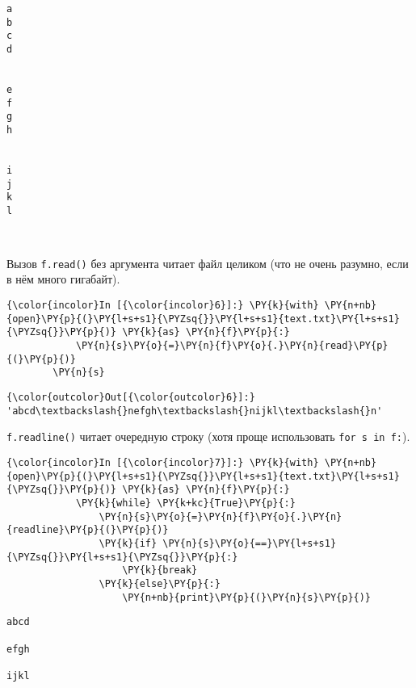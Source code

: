     \begin{Verbatim}[commandchars=\\\{\}]
a
b
c
d


e
f
g
h


i
j
k
l



    \end{Verbatim}

    Вызов \texttt{f.read()} без аргумента читает файл целиком (что не очень
разумно, если в нём много гигабайт).

    \begin{Verbatim}[commandchars=\\\{\}]
{\color{incolor}In [{\color{incolor}6}]:} \PY{k}{with} \PY{n+nb}{open}\PY{p}{(}\PY{l+s+s1}{\PYZsq{}}\PY{l+s+s1}{text.txt}\PY{l+s+s1}{\PYZsq{}}\PY{p}{)} \PY{k}{as} \PY{n}{f}\PY{p}{:}
            \PY{n}{s}\PY{o}{=}\PY{n}{f}\PY{o}{.}\PY{n}{read}\PY{p}{(}\PY{p}{)}
        \PY{n}{s}
\end{Verbatim}

            \begin{Verbatim}[commandchars=\\\{\}]
{\color{outcolor}Out[{\color{outcolor}6}]:} 'abcd\textbackslash{}nefgh\textbackslash{}nijkl\textbackslash{}n'
\end{Verbatim}
        
    \texttt{f.readline()} читает очередную строку (хотя проще использовать
\texttt{for\ s\ in\ f:}).

    \begin{Verbatim}[commandchars=\\\{\}]
{\color{incolor}In [{\color{incolor}7}]:} \PY{k}{with} \PY{n+nb}{open}\PY{p}{(}\PY{l+s+s1}{\PYZsq{}}\PY{l+s+s1}{text.txt}\PY{l+s+s1}{\PYZsq{}}\PY{p}{)} \PY{k}{as} \PY{n}{f}\PY{p}{:}
            \PY{k}{while} \PY{k+kc}{True}\PY{p}{:}
                \PY{n}{s}\PY{o}{=}\PY{n}{f}\PY{o}{.}\PY{n}{readline}\PY{p}{(}\PY{p}{)}
                \PY{k}{if} \PY{n}{s}\PY{o}{==}\PY{l+s+s1}{\PYZsq{}}\PY{l+s+s1}{\PYZsq{}}\PY{p}{:}
                    \PY{k}{break}
                \PY{k}{else}\PY{p}{:}
                    \PY{n+nb}{print}\PY{p}{(}\PY{n}{s}\PY{p}{)}
\end{Verbatim}

    \begin{Verbatim}[commandchars=\\\{\}]
abcd

efgh

ijkl


    \end{Verbatim}

